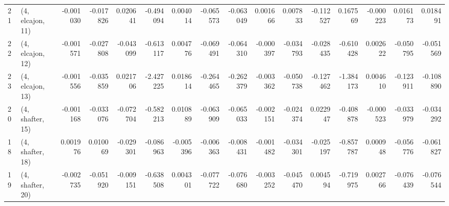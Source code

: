 \begin{tabular}{llrrrrrrrrrrrrrr}
21 &  (4, elcajon, 11) &  -0.001030 & -0.017826 &  0.020641 &  -0.494094 &  0.004014 &  -0.065573 & -0.063049 &  0.001666 &  0.007833 & -0.112527 &   0.167569 & -0.000223 &  0.016173 &  0.018491 \\
22 &  (4, elcajon, 12) &  -0.001571 & -0.027808 & -0.043099 &  -0.613117 &  0.004776 &  -0.069491 & -0.064310 & -0.000397 & -0.034793 & -0.028435 &  -0.610428 &  0.002622 & -0.050795 & -0.051569 \\
23 &  (4, elcajon, 13) &  -0.001556 & -0.035859 &  0.021706 &  -2.427225 &  0.018614 &  -0.264465 & -0.262379 & -0.003362 & -0.050738 & -0.127462 &  -1.384173 &  0.004610 & -0.123911 & -0.108890 \\
20 &  (4, shafter, 15) &  -0.001168 & -0.033076 & -0.072704 &  -0.582213 &  0.010889 &  -0.063909 & -0.065033 & -0.002151 & -0.024374 &  0.022947 &  -0.408878 & -0.000523 & -0.033979 & -0.034292 \\
18 &  (4, shafter, 18) &   0.001976 &  0.010069 & -0.029301 &  -0.086963 & -0.005396 &  -0.006363 & -0.008431 & -0.001482 & -0.034301 & -0.025197 &  -0.857787 &  0.000948 & -0.056776 & -0.061827 \\
19 &  (4, shafter, 20) &  -0.002735 & -0.051920 & -0.009151 &  -0.638508 &  0.004301 &  -0.077722 & -0.076680 & -0.003252 & -0.045470 &  0.004594 &  -0.719975 &  0.002766 & -0.076439 & -0.076544 \\
\bottomrule
\end{tabular}
